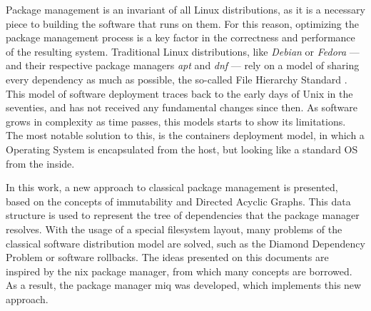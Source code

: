 Package management is an invariant of all Linux distributions, as it is a
necessary piece to building the software that runs on them. For this reason,
optimizing the package management process is a key factor in the correctness and
performance of the resulting system. Traditional Linux distributions, like
\textit{Debian} or \textit{Fedora} --- and their respective
package managers \textit{apt} and \textit{dnf} --- rely on a
model of sharing every dependency as much as possible, the so-called File
Hierarchy Standard . This model of software
deployment traces back to the early days of Unix in the seventies, and has not
received any fundamental changes since then. As software grows in complexity as
time passes, this models starts to show its limitations. The most notable
solution to this, is the containers deployment model, in which a Operating
System is encapsulated from the host, but looking like a standard OS from the inside.


In this work, a new approach to classical package
management is presented, based on the concepts of immutability and
Directed Acyclic Graphs. This data structure is used to represent the tree of dependencies
that the package manager resolves. With the usage of a special filesystem
layout, many problems of the classical software distribution model are solved,
such as the Diamond Dependency Problem or software rollbacks.
The ideas presented on this documents are inspired by the nix package manager,
from which many concepts are borrowed. As a result, the package manager miq was
developed, which implements this new approach.
